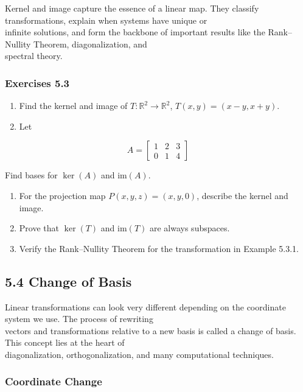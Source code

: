 \documentclass[
  12pt,
  a4paper,
]{article}
\begin{document}
Kernel and image capture the essence of a linear map. They classify
transformations, explain when systems have unique or\\
infinite solutions, and form the backbone of important results like the
Rank--Nullity Theorem, diagonalization, and\\
spectral theory.

\subsubsection{Exercises 5.3}\label{exercises-53}

\begin{enumerate}
\def\labelenumi{\arabic{enumi}.}
\item
  Find the kernel and image of \(T:\mathbb{R}^2 \to \mathbb{R}^2\),
  \(T(x,y) = (x-y, x+y)\).
\item
  Let
\end{enumerate}

\[A = \begin{bmatrix} 1 & 2 & 3 \\ 0 & 1 & 4 \end{bmatrix}\]

Find bases for \(\ker(A)\) and \(\text{im}(A)\).

\begin{enumerate}
\def\labelenumi{\arabic{enumi}.}
\item
  For the projection map \(P(x,y,z) = (x,y,0)\), describe the kernel and
  image.
\item
  Prove that \(\ker(T)\) and \(\text{im}(T)\) are always subspaces.
\item
  Verify the Rank--Nullity Theorem for the transformation in Example
  5.3.1.
\end{enumerate}

\subsection{5.4 Change of Basis}\label{54-change-of-basis}

Linear transformations can look very different depending on the
coordinate system we use. The process of rewriting\\
vectors and transformations relative to a new basis is called a change
of basis. This concept lies at the heart of\\
diagonalization, orthogonalization, and many computational techniques.

\subsubsection{Coordinate Change}\label{coordinate-change}
\end{document}
